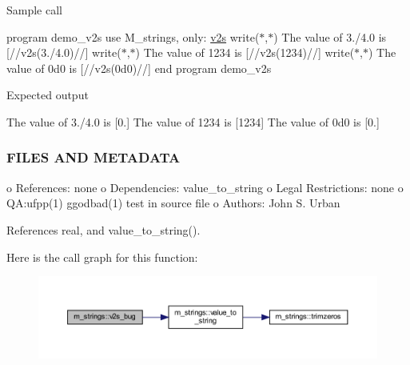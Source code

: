 Sample call

program demo\+\_\+v2s use M\+\_\+strings, only\+: \hyperlink{interfacem__strings_1_1v2s}{v2s} write($\ast$,$\ast$) \textquotesingle{}The value of 3./4.0 is \mbox{[}\textquotesingle{}//v2s(3./4.0)//\textquotesingle{}\mbox{]}\textquotesingle{} write($\ast$,$\ast$) \textquotesingle{}The value of 1234 is \mbox{[}\textquotesingle{}//v2s(1234)//\textquotesingle{}\mbox{]}\textquotesingle{} write($\ast$,$\ast$) \textquotesingle{}The value of 0d0 is \mbox{[}\textquotesingle{}//v2s(0d0)//\textquotesingle{}\mbox{]}\textquotesingle{} end program demo\+\_\+v2s

Expected output

The value of 3./4.0 is \mbox{[}0.\mbox{]} The value of 1234 is \mbox{[}1234\mbox{]} The value of 0d0 is \mbox{[}0.\mbox{]}

\subsubsection*{F\+I\+L\+ES A\+ND M\+E\+T\+A\+D\+A\+TA}

\begin{DoxyVerb}   o  References: none
   o  Dependencies: value_to_string
   o  Legal Restrictions: none
   o  QA:ufpp(1) ggodbad(1) test in source file
   o  Authors: John S. Urban \end{DoxyVerb}
 

References real, and value\+\_\+to\+\_\+string().

Here is the call graph for this function\+:
\nopagebreak
\begin{figure}[H]
\begin{center}
\leavevmode
\includegraphics[width=350pt]{namespacem__strings_a76a00e3ca7fb7c9b9cadcd484c6e3946_cgraph}
\end{center}
\end{figure}
\mbox{\label{namespacem__strings_a58d30b135c367184a666f8b4baaa64b5}} 
